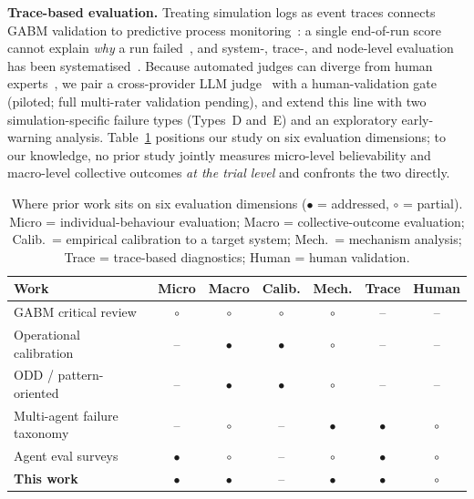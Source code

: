 \documentclass[runningheads]{llncs}
\begin{document}
\textbf{Trace-based evaluation.} Treating simulation logs as event traces connects GABM validation to predictive process monitoring~\cite{galanti2020explainable}: a single end-of-run score cannot explain \emph{why} a run failed~\cite{cemri2025fails}, and system-, trace-, and node-level evaluation has been systematised~\cite{yehudai2026clear}. Because automated judges can diverge from human experts~\cite{pan2025agentrewardbench}, we pair a cross-provider LLM judge~\cite{zheng2023judging} with a human-validation gate (piloted; full multi-rater validation pending), and extend this line with two simulation-specific failure types (Types~D and~E) and an exploratory early-warning analysis. Table~\ref{tab:related} positions our study on six evaluation dimensions; to our knowledge, no prior study jointly measures micro-level believability and macro-level collective outcomes \emph{at the trial level} and confronts the two directly.
\begin{table}[t]
\centering
\caption{Where prior work sits on six evaluation dimensions ($\bullet$ = addressed, $\circ$ = partial). Micro = individual-behaviour evaluation; Macro = collective-outcome evaluation; Calib.\ = empirical calibration to a target system; Mech.\ = mechanism analysis; Trace = trace-based diagnostics; Human = human validation.}
\label{tab:related}
\small
\setlength{\tabcolsep}{4.5pt}
\begin{tabular}{lcccccc}
\toprule
Work & Micro & Macro & Calib. & Mech. & Trace & Human \\
\midrule
GABM critical review~\cite{larooij2025critical}      & $\circ$ & $\circ$ & $\circ$ & $\circ$ & --      & -- \\
Operational calibration~\cite{tomasevic2026operational} & --      & $\bullet$ & $\bullet$ & $\circ$ & --   & -- \\
ODD / pattern-oriented~\cite{grimm2020odd,grimm2005pom} & --   & $\bullet$ & $\bullet$ & $\circ$ & --   & -- \\
Multi-agent failure taxonomy~\cite{cemri2025fails}   & --      & $\circ$ & --      & $\bullet$ & $\bullet$ & $\circ$ \\
Agent eval surveys~\cite{mohammadi2025evaluation,yehudai2026clear} & $\bullet$ & $\circ$ & -- & $\circ$ & $\bullet$ & $\circ$ \\
\textbf{This work} & $\bullet$ & $\bullet$ & -- & $\bullet$ & $\bullet$ & $\circ$ \\
\bottomrule
\end{tabular}
\end{table}
\end{document}

